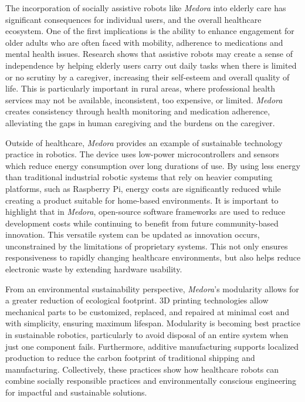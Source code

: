 The incorporation of socially assistive robots like \textit{Medora} into elderly care has significant consequences for individual users, and the overall healthcare ecosystem. One of the first implications is the ability to enhance engagement for older adults who are often faced with mobility, adherence to medications and mental health issues. Research shows that assistive robots may create a sense of independence by helping elderly users carry out daily tasks when there is limited or no scrutiny by a caregiver, increasing their self-esteem and overall quality of life. This is particularly important in rural areas, where professional health services may not be available, inconsistent, too expensive, or limited. \textit{Medora} creates consistency through health monitoring and medication adherence, alleviating the gaps in human caregiving and the burdens on the caregiver.

Outside of healthcare, \textit{Medora} provides an example of sustainable technology practice in robotics. The device uses low-power microcontrollers and sensors which reduce energy consumption over long durations of use. By using less energy than traditional industrial robotic systems that rely on heavier computing platforms, such as Raspberry Pi, energy costs are significantly reduced while creating a product suitable for home-based environments. It is important to highlight that in \textit{Medora}, open-source software frameworks are used to reduce development costs while continuing to benefit from future community-based innovation. This versatile system can be updated as innovation occurs, unconstrained by the limitations of proprietary systems. This not only ensures responsiveness to rapidly changing healthcare environments, but also helps reduce electronic waste by extending hardware usability.

From an environmental sustainability perspective, \textit{Medora}'s modularity allows for a greater reduction of ecological footprint. 3D printing technologies allow mechanical parts to be customized, replaced, and repaired at minimal cost and with simplicity, ensuring maximum lifespan. Modularity is becoming best practice in sustainable robotics, particularly to avoid disposal of an entire system when just one component fails. Furthermore, additive manufacturing supports localized production to reduce the carbon footprint of traditional shipping and manufacturing. Collectively, these practices show how healthcare robots can combine socially responsible practices and environmentally conscious engineering for impactful and sustainable solutions.


